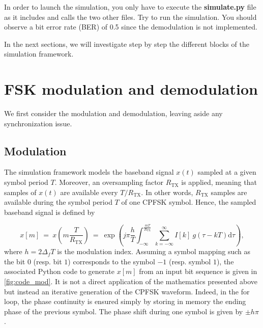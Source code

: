In order to launch the simulation, you only have to execute the \textbf{simulate.py} file as it includes and calls the two other files. Try to run the simulation. You should observe a bit error rate (BER) of 0.5 since the demodulation is not implemented.

In the next sections, we will investigate step by step the different blocks of the simulation framework.

\section{FSK modulation and demodulation}
We first consider the modulation and demodulation, leaving aside any synchronization issue.

\subsection{Modulation}
The simulation framework models the baseband signal $x(t)$ sampled at a given symbol period $T$. Moreover, an oversampling factor $R_{\text{TX}}$ is applied, meaning that samples of $x(t) $ are available every $T/R_{\text{TX}}$. In other words, $R_{\text{TX}}$ samples are available during the symbol period $T$ of one CPFSK symbol. Hence, the sampled baseband signal is defined by

\begin{equation*}
    x[m] \:=\:x\left(m\frac{T}{R_{\text{TX}}}\right)\:=\:\exp \left(j\pi \frac{h}{T} \int_{-\infty}^{\frac{mT}{R_{\text{TX}}}} \sum_{k=-\infty}^{\infty}I[k]\:g(\tau-kT) \text{d}\tau \right),
\end{equation*}
where $h=2 \Delta_f T$ is the modulation index.
Assuming a symbol mapping such as the bit $0$ (resp. bit $1$) corresponds to the symbol $-1$ (resp. symbol $1$), the associated Python code to generate $x[m]$ from an input bit sequence is given in \autoref{fig:code_mod}. It is not a direct application of the mathematics presented above but instead an iterative generation of the CPFSK waveform. Indeed, in the for loop, the phase continuity is ensured simply by storing in memory the ending phase of the previous symbol. The phase shift during one symbol is given by $\pm h\pi$.

\begin{listing}[H]
\caption{Python code for 2-CPFSK modulation.}
\label{fig:code_mod}
\end{listing}



